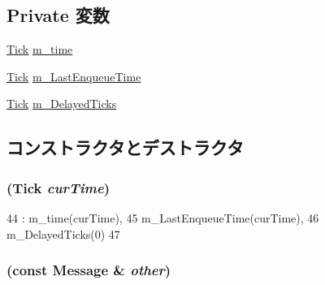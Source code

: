\subsection*{Private 変数}
\begin{DoxyCompactItemize}
\item 
\hyperlink{base_2types_8hh_a5c8ed81b7d238c9083e1037ba6d61643}{Tick} \hyperlink{classMessage_adb6d90850c7a231a52313b5bc7e5df68}{m\_\-time}
\item 
\hyperlink{base_2types_8hh_a5c8ed81b7d238c9083e1037ba6d61643}{Tick} \hyperlink{classMessage_ad90d632670cb643acb9003a49fb0a5a6}{m\_\-LastEnqueueTime}
\item 
\hyperlink{base_2types_8hh_a5c8ed81b7d238c9083e1037ba6d61643}{Tick} \hyperlink{classMessage_a905d53a402b92e02778dea8c4374a5f1}{m\_\-DelayedTicks}
\end{DoxyCompactItemize}


\subsection{コンストラクタとデストラクタ}
\hypertarget{classMessage_ad5b14af159b464dd3d9c26706260f0ba}{
\subsubsection[{Message}]{ ({\bf Tick} {\em curTime})}}
\label{classMessage_ad5b14af159b464dd3d9c26706260f0ba}



\begin{DoxyCode}
44         : m_time(curTime),
45           m_LastEnqueueTime(curTime),
46           m_DelayedTicks(0)
47     { }
\end{DoxyCode}
\hypertarget{classMessage_ac28205263989800da0204904b9475f31}{
\subsubsection[{Message}]{ (const {\bf Message} \& {\em other})}}
\label{classMessage_ac28205263989800da0204904b9475f31}



